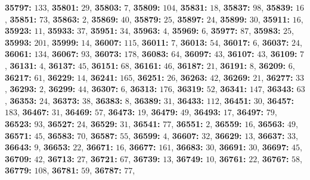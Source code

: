 \textsf{\bfseries 35797:} $133$, \textsf{\bfseries 35801:} $29$, \textsf{\bfseries 35803:} $7$, \textsf{\bfseries 35809:} $104$, \textsf{\bfseries 35831:} $18$, \textsf{\bfseries 35837:} $98$, \textsf{\bfseries 35839:} $16$, \textsf{\bfseries 35851:} $73$, \textsf{\bfseries 35863:} $2$, \textsf{\bfseries 35869:} $40$, \textsf{\bfseries 35879:} $25$, \textsf{\bfseries 35897:} $24$, \textsf{\bfseries 35899:} $30$, \textsf{\bfseries 35911:} $16$, \textsf{\bfseries 35923:} $11$, \textsf{\bfseries 35933:} $37$, \textsf{\bfseries 35951:} $34$, \textsf{\bfseries 35963:} $4$, \textsf{\bfseries 35969:} $6$, \textsf{\bfseries 35977:} $87$, \textsf{\bfseries 35983:} $25$, \textsf{\bfseries 35993:} $201$, \textsf{\bfseries 35999:} $14$, \textsf{\bfseries 36007:} $115$, \textsf{\bfseries 36011:} $7$, \textsf{\bfseries 36013:} $54$, \textsf{\bfseries 36017:} $6$, \textsf{\bfseries 36037:} $24$, \textsf{\bfseries 36061:} $134$, \textsf{\bfseries 36067:} $93$, \textsf{\bfseries 36073:} $178$, \textsf{\bfseries 36083:} $64$, \textsf{\bfseries 36097:} $43$, \textsf{\bfseries 36107:} $43$, \textsf{\bfseries 36109:} $7$, \textsf{\bfseries 36131:} $4$, \textsf{\bfseries 36137:} $45$, \textsf{\bfseries 36151:} $68$, \textsf{\bfseries 36161:} $46$, \textsf{\bfseries 36187:} $21$, \textsf{\bfseries 36191:} $8$, \textsf{\bfseries 36209:} $6$, \textsf{\bfseries 36217:} $61$, \textsf{\bfseries 36229:} $14$, \textsf{\bfseries 36241:} $165$, \textsf{\bfseries 36251:} $26$, \textsf{\bfseries 36263:} $42$, \textsf{\bfseries 36269:} $21$, \textsf{\bfseries 36277:} $33$, \textsf{\bfseries 36293:} $2$, \textsf{\bfseries 36299:} $44$, \textsf{\bfseries 36307:} $6$, \textsf{\bfseries 36313:} $176$, \textsf{\bfseries 36319:} $52$, \textsf{\bfseries 36341:} $147$, \textsf{\bfseries 36343:} $63$, \textsf{\bfseries 36353:} $24$, \textsf{\bfseries 36373:} $38$, \textsf{\bfseries 36383:} $8$, \textsf{\bfseries 36389:} $31$, \textsf{\bfseries 36433:} $112$, \textsf{\bfseries 36451:} $30$, \textsf{\bfseries 36457:} $183$, \textsf{\bfseries 36467:} $31$, \textsf{\bfseries 36469:} $57$, \textsf{\bfseries 36473:} $19$, \textsf{\bfseries 36479:} $49$, \textsf{\bfseries 36493:} $17$, \textsf{\bfseries 36497:} $79$, \textsf{\bfseries 36523:} $93$, \textsf{\bfseries 36527:} $24$, \textsf{\bfseries 36529:} $31$, \textsf{\bfseries 36541:} $77$, \textsf{\bfseries 36551:} $2$, \textsf{\bfseries 36559:} $16$, \textsf{\bfseries 36563:} $49$, \textsf{\bfseries 36571:} $45$, \textsf{\bfseries 36583:} $70$, \textsf{\bfseries 36587:} $55$, \textsf{\bfseries 36599:} $4$, \textsf{\bfseries 36607:} $32$, \textsf{\bfseries 36629:} $13$, \textsf{\bfseries 36637:} $33$, \textsf{\bfseries 36643:} $9$, \textsf{\bfseries 36653:} $22$, \textsf{\bfseries 36671:} $16$, \textsf{\bfseries 36677:} $161$, \textsf{\bfseries 36683:} $30$, \textsf{\bfseries 36691:} $30$, \textsf{\bfseries 36697:} $45$, \textsf{\bfseries 36709:} $42$, \textsf{\bfseries 36713:} $27$, \textsf{\bfseries 36721:} $67$, \textsf{\bfseries 36739:} $13$, \textsf{\bfseries 36749:} $10$, \textsf{\bfseries 36761:} $22$, \textsf{\bfseries 36767:} $58$, \textsf{\bfseries 36779:} $108$, \textsf{\bfseries 36781:} $59$, \textsf{\bfseries 36787:} $77$, 
